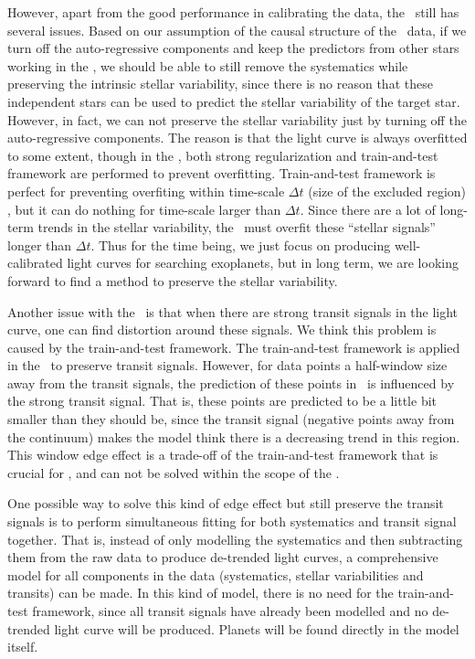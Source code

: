 However, apart from the good performance in calibrating the data, the \name\ still has several issues. 
Based on our assumption of the causal structure of the \Kepler\ data, if we turn off the auto-regressive components and keep the predictors from other stars working in the \name, we should be able to still remove the systematics while preserving the intrinsic stellar variability, since there is no reason that these independent stars can be used to predict the stellar variability of the target star.
However, in fact, we can not preserve the stellar variability just by turning off the auto-regressive components. 
The reason is that the light curve is always overfitted to some extent, though in the \name, both strong regularization and train-and-test framework are performed to prevent overfitting. Train-and-test framework is perfect for preventing overfiting within time-scale $\Delta t$ (size of the excluded region) , but it can do nothing for time-scale larger than $\Delta t$. Since there are a lot of long-term trends in the stellar variability, the \name\ must overfit these ``stellar signals'' longer than $\Delta t$.
Thus for the time being, we just focus on producing well-calibrated light curves for searching exoplanets, but in long term, we are looking forward to find a method to preserve the stellar variability.

Another issue with the \name\ is that when there are strong transit signals in the light curve, one can find distortion around these signals.
We think this problem is caused by the train-and-test framework.
The train-and-test framework is applied in the \name\ to preserve transit signals.
However, for data points a half-window size away from the transit signals, the prediction of these points in \name\ is influenced by the strong transit signal.
That is,  these points are predicted to be a little bit smaller than they should be, since the transit signal (negative points away from the continuum) makes the model think there is a decreasing trend in this region.
This window edge effect is a trade-off of the train-and-test framework that is crucial for \name, and can not be solved within the scope of the \name.

One possible way to solve this kind of edge effect but still preserve the transit signals is to perform simultaneous fitting for both systematics and transit signal together\citep{dfm}. 
That is,  instead of only modelling the systematics and then subtracting them from the raw data to produce de-trended light curves, a comprehensive model for all components in the data (systematics, stellar variabilities and transits)  can be made. In this kind of model, there is no need for the train-and-test framework, since all transit signals have already been modelled and no de-trended light curve will be produced. Planets will be found directly in the model itself. 

